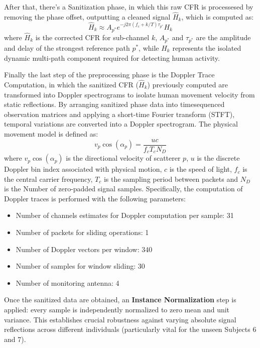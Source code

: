 After that, there's a Sanitization phase, in which this raw CFR is processesed by removing the phase offset, outputting a cleaned signal $\hat{H}_k$, which is computed as:
\begin{equation}
\hat{H}_k \approx A_{p^*} e^{-j2\pi(f_c+k/T)\tau_{p^*}} H_k
\end{equation}
where $\hat{H}_k$ is the corrected CFR for sub-channel $k$, $A_{p^*}$ and $\tau_{p^*}$ are the amplitude and delay of the strongest reference path $p^*$, while $H_k$ represents the isolated dynamic multi-path component required for detecting human activity.

Finally the last step of the preprocessing phase is the Doppler Trace Computation, in which the sanitized CFR ($\hat{H}_k$) previously computed are transformed into Doppler spectrograms to isolate human movement velocity from static reflections. By arranging sanitized phase data into timesequenced observation matrices and applying a short-time Fourier transform (STFT), temporal variations are converted into a Doppler spectrogram. The physical movement model is defined as:
\begin{equation}
v_p \cos(\alpha_p) = \frac{u c}{f_c T_c N_D}
\end{equation}
where $v_p \cos(\alpha_p)$ is the directional velocity of scatterer $p$, $u$ is the discrete Doppler bin index associated with physical motion, $c$ is the speed of light, $f_c$ is the central carrier frequency, $T_c$ is the sampling period between packets and $N_D$ is the Number of zero-padded signal samples. Specifically, the computation of Doppler traces is performed with the following parameters:
\begin{itemize}
\item Number of channels estimates for Doppler computation per sample: 31
\item Number of packets for sliding operations: 1
\item Number of Doppler vectors per window: 340
\item Number of samples for window sliding: 30
\item Number of monitoring antenna: 4
\end{itemize}

Once the sanitized data are obtained, an \textbf{Instance Normalization} step is applied: every sample is independently normalized to zero mean and unit variance. This establishes crucial robustness against varying absolute signal reflections across different individuals (particularly vital for the unseen Subjects 6 and 7).

